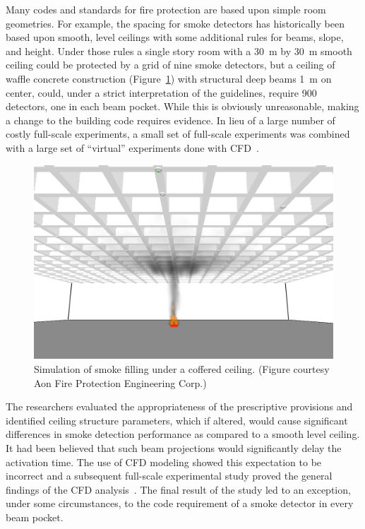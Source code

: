 \documentclass[graybox]{svmult}
\begin{document}
Many codes and standards for fire protection are based upon simple room geometries. For example, the spacing for smoke detectors has historically been based upon smooth, level ceilings with some additional rules for beams, slope, and height.  Under those rules a single story room with a 30~m by 30~m smooth ceiling could be protected by a grid of nine smoke detectors, but a ceiling of waffle concrete construction (Figure~\ref{waffle_ceiling}) with structural deep beams 1~m on center, could, under a strict interpretation of the guidelines, require 900 detectors, one in each beam pocket. While this is obviously unreasonable, making a change to the building code requires evidence. In lieu of a large number of costly full-scale experiments, a small set of full-scale experiments was combined with a large set of ``virtual'' experiments done with CFD~\cite{O'Connor:NFPRF,Mealy:NFPRF}.
\begin{figure}[ht]
\includegraphics[width=\textwidth]{Fig_waffle_ceiling}
\caption{Simulation of smoke filling under a coffered ceiling. (Figure courtesy Aon Fire Protection Engineering Corp.)}
\label{waffle_ceiling}
\end{figure}
The researchers evaluated the appropriateness of the prescriptive provisions and identified ceiling structure parameters, which if altered, would cause significant differences in smoke detection performance as compared to a smooth level ceiling. It had been believed that such beam projections would significantly delay the activation time. The use of CFD modeling showed this expectation to be incorrect and a subsequent full-scale experimental study proved the general findings of the CFD analysis~\cite{Gottuk:2008}. The final result of the study led to an exception, under some circumstances, to the code requirement of a smoke detector in every beam pocket.
\end{document}
